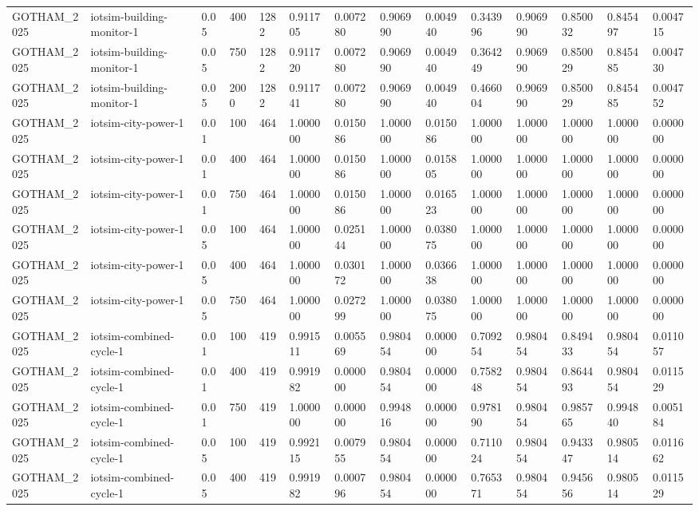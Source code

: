 \begin{tabular}{llllllllllllll}
GOTHAM\_2025 & iotsim-building-monitor-1 & 0.05 & 400 & 1282 & 0.911705 & 0.007280 & 0.906990 & 0.004940 & 0.343996 & 0.906990 & 0.850032 & 0.845497 & 0.004715 \\
GOTHAM\_2025 & iotsim-building-monitor-1 & 0.05 & 750 & 1282 & 0.911720 & 0.007280 & 0.906990 & 0.004940 & 0.364249 & 0.906990 & 0.850029 & 0.845485 & 0.004730 \\
GOTHAM\_2025 & iotsim-building-monitor-1 & 0.05 & 2000 & 1282 & 0.911741 & 0.007280 & 0.906990 & 0.004940 & 0.466004 & 0.906990 & 0.850029 & 0.845485 & 0.004752 \\
GOTHAM\_2025 & iotsim-city-power-1 & 0.01 & 100 & 464 & 1.000000 & 0.015086 & 1.000000 & 0.015086 & 1.000000 & 1.000000 & 1.000000 & 1.000000 & 0.000000 \\
GOTHAM\_2025 & iotsim-city-power-1 & 0.01 & 400 & 464 & 1.000000 & 0.015086 & 1.000000 & 0.015805 & 1.000000 & 1.000000 & 1.000000 & 1.000000 & 0.000000 \\
GOTHAM\_2025 & iotsim-city-power-1 & 0.01 & 750 & 464 & 1.000000 & 0.015086 & 1.000000 & 0.016523 & 1.000000 & 1.000000 & 1.000000 & 1.000000 & 0.000000 \\
GOTHAM\_2025 & iotsim-city-power-1 & 0.05 & 100 & 464 & 1.000000 & 0.025144 & 1.000000 & 0.038075 & 1.000000 & 1.000000 & 1.000000 & 1.000000 & 0.000000 \\
GOTHAM\_2025 & iotsim-city-power-1 & 0.05 & 400 & 464 & 1.000000 & 0.030172 & 1.000000 & 0.036638 & 1.000000 & 1.000000 & 1.000000 & 1.000000 & 0.000000 \\
GOTHAM\_2025 & iotsim-city-power-1 & 0.05 & 750 & 464 & 1.000000 & 0.027299 & 1.000000 & 0.038075 & 1.000000 & 1.000000 & 1.000000 & 1.000000 & 0.000000 \\
GOTHAM\_2025 & iotsim-combined-cycle-1 & 0.01 & 100 & 419 & 0.991511 & 0.005569 & 0.980454 & 0.000000 & 0.709254 & 0.980454 & 0.849433 & 0.980454 & 0.011057 \\
GOTHAM\_2025 & iotsim-combined-cycle-1 & 0.01 & 400 & 419 & 0.991982 & 0.000000 & 0.980454 & 0.000000 & 0.758248 & 0.980454 & 0.864493 & 0.980454 & 0.011529 \\
GOTHAM\_2025 & iotsim-combined-cycle-1 & 0.01 & 750 & 419 & 1.000000 & 0.000000 & 0.994816 & 0.000000 & 0.978190 & 0.980454 & 0.985765 & 0.994840 & 0.005184 \\
GOTHAM\_2025 & iotsim-combined-cycle-1 & 0.05 & 100 & 419 & 0.992115 & 0.007955 & 0.980454 & 0.000000 & 0.711024 & 0.980454 & 0.943347 & 0.980514 & 0.011662 \\
GOTHAM\_2025 & iotsim-combined-cycle-1 & 0.05 & 400 & 419 & 0.991982 & 0.000796 & 0.980454 & 0.000000 & 0.765371 & 0.980454 & 0.945656 & 0.980514 & 0.011529 \\

\end{tabular}
